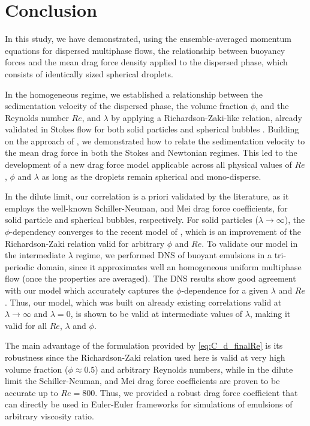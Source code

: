 \section{Conclusion}

In this study, we have demonstrated, using the ensemble-averaged momentum equations for dispersed multiphase flows, the relationship between buoyancy forces and the mean drag force density applied to the dispersed phase, which consists of identically sized spherical droplets. 

In the homogeneous regime, we established a relationship between the sedimentation velocity of the dispersed phase, the volume fraction $\phi$, and the Reynolds number $Re$, and $\lambda$ by applying a Richardson-Zaki-like relation, already validated in Stokes flow for both solid particles and spherical bubbles .
Building on the approach of \citet{jackson2000}, we demonstrated how to relate the sedimentation velocity to the mean drag force in both the Stokes and Newtonian regimes. 
This led to the development of a new drag force model applicable across all physical values of  $Re$, $\phi$ and $\lambda$ as long as the droplets remain spherical and mono-disperse. 

In the dilute limit, our correlation is a priori validated by the literature, as it employs the well-known Schiller-Neuman, and Mei drag force coefficients, for solid particle and spherical bubbles, respectively. 
For solid particles ($\lambda \to \infty$), the $\phi$-dependency converges to the recent model of \citet{kramer2019improvement}, which is an improvement of the Richardson-Zaki relation valid for arbitrary $\phi$ and $Re$.
To validate our model in the intermediate $\lambda$ regime, we performed DNS of buoyant emulsions in a tri-periodic domain, since it approximates well an homogeneous uniform multiphase flow (once the properties are averaged).
The DNS results show good agreement with our model which accurately captures the $\phi$-dependence for a given $\lambda$ and $Re$.
Thus, our model, which was built on already existing correlations valid at $\lambda\to\infty$ and $\lambda = 0$, is shown to be valid at intermediate values of $\lambda$, making it valid for all $Re$, $\lambda$ and $\phi$.  

The main advantage of the formulation provided by \ref{eq:C_d_finalRe} is its robustness since the Richardson-Zaki relation used here is valid at very high volume fraction  ($\phi \approx 0.5$) and arbitrary Reynolds numbers, while in the dilute limit the Schiller-Neuman, and Mei drag force coefficients are proven to be accurate up to $Re = 800$. 
Thus, we provided a robust drag force coefficient that can directly be used in Euler-Euler frameworks for simulations of emulsions of arbitrary viscosity ratio. 